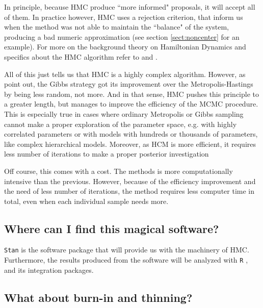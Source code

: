 In principle, because HMC produce ``more informed" proposals, it will accept all of them. In practice however, HMC uses a rejection criterion, that inform us when the method was not able to maintain the ``balance" of the system, producing a bad numeric approximation (see section \ref{sect:noncenter} for an example). For more on the background theory on Hamiltonian Dynamics and specifics about the HMC algorithm refer to \citet{Neal_2011} and \citet{Betancourt_et_al_2013}.

All of this just tells us that HMC is a highly complex algorithm. However, as \citet{McElreath_2020} point out, the Gibbs strategy got its improvement over the Metropolis-Hastings by being less random, not more. And in that sense, HMC pushes this principle to a greater length, but manages to improve the efficiency of the MCMC procedure. This is especially true in cases where ordinary Metropolis or Gibbs sampling cannot make a proper exploration of the parameter space, e.g. with highly correlated parameters or with models with hundreds or thousands of parameters, like complex hierarchical models. Moreover, as HCM is more efficient, it requires less number of iterations to make a proper posterior investigation \cite{McElreath_2020, Gelman_et_al_2014} 

Off course, this comes with a cost. The methods is more computationally intensive than the previous. However, because of the efficiency improvement and the need of less number of iterations, the method requires less computer time in total, even when each individual sample needs more.


\subsection{Where can I find this magical software?} \label{sub_sect:software}

\texttt{Stan} \cite{Stan2020} is the software package that will provide us with the machinery of HMC. Furthermore, the results produced from the software will be analyzed with \texttt{R} \cite{R2015, RStan2020}, and its integration packages. 


\subsection{What about burn-in and thinning?} \label{sub_sect:burn}

